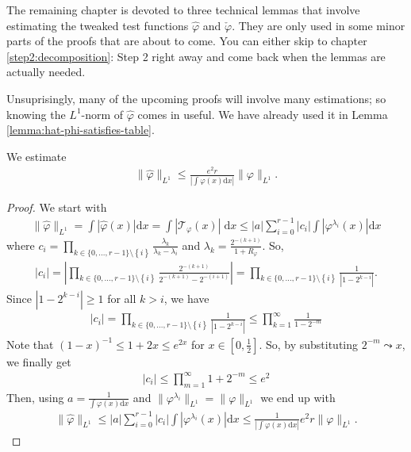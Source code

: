 The remaining chapter is devoted to three technical lemmas that involve estimating the tweaked test functions $\hat \varphi$ and $\check \varphi$. They are only used in some minor parts of the proofs that are about to come. You can either skip to chapter \ref{step2:decomposition}: Step 2 right away and come back when the lemmas are actually needed.

Unsuprisingly, many of the upcoming proofs will involve many estimations; so knowing the $L^1$-norm of $\hat \varphi$ comes in useful. We have already used it in Lemma \ref{lemma:hat-phi-satisfies-table}.
\begin{lemma}\label{lemma:tweaked-l1-norm}
We estimate
\begin{align}\label{tweaked-l1-norm}
    \lVert \hat \varphi \rVert_{L^1} \leq \frac{e^2 r}{|\int \varphi(x) \mathrm{d}x |} \lVert \varphi \rVert_{L^1}.
\end{align}
\end{lemma}

\begin{proof}
    We start with 
    \begin{align*}
        \lVert \hat \varphi \rVert_{L^1} = \int |\hat \varphi(x)| \mathrm{d}x = \int |\mathcal{T}_{\varphi}(x)| \; \mathrm{d}x \leq |a| \sum^{r-1}_{i=0} |c_i| \int |\varphi^{\lambda_i}(x)| \mathrm{d}x
    \end{align*}
    where $c_i = \prod_{k \in \{0,...,r-1\} \setminus\left\{ i \right\} } \frac{\lambda_k}{\lambda_k - \lambda_i}$ and $\lambda_k = \frac{2^{-(k+1)}}{1+R_\varphi}$. So, 
    \begin{align*}
        |c_i| = \left|\prod_{k \in \{0,...,r-1\} \setminus\left\{ i \right\} } \frac{2^{-(k+1)}}{2^{-(k+1)} - 2^{-(i+1)}}\right| = \prod_{k \in \{0,...,r-1\} \setminus\left\{ i \right\} } \frac{1}{|1 - 2^{k - i}|}.
    \end{align*} 
    Since $|1 - 2^{k - i}| \geq 1$ for all $k > i$, we have   
    \begin{align*}
        |c_i| = \prod_{k \in \{0,...,r-1\} \setminus\left\{ i \right\} } \frac{1}{|1 - 2^{k - i}|} \leq \prod^\infty_{k=1} \frac{1}{1 - 2^{-m}}
    \end{align*}
    Note that $(1-x)^{-1} \leq 1 + 2x \leq e^{2x}$ for $x \in [0,\frac{1}{2}]$. So, by substituting $2^{-m} \leadsto x$, we finally get 
    \begin{align}\label{jsknfjkewfwhiru}
        |c_i| \leq \prod^\infty_{m=1} 1 + 2^{-m} \leq e^2
    \end{align}
    Then, using $a = \frac{1}{\int \varphi(x)\mathrm{d}x}$ and $ \lVert \varphi^{\lambda_i} \rVert_{L^1} =  \lVert \varphi \rVert_{L^1} $  we end up with 
    \begin{align*}
        \lVert \hat \varphi \rVert_{L^1} \leq |a| \sum^{r-1}_{i=0} |c_i| \int |\varphi^{\lambda_i}(x)| \mathrm{d}x \leq \frac{1}{|\int \varphi(x) \mathrm{d}x|} e^2r \lVert \varphi \rVert_{L^1}.
    \end{align*}
\end{proof}

